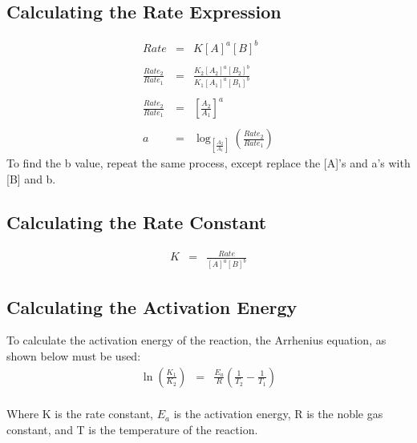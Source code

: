 \documentclass{article}
\begin{document}
\subsection*{Calculating the Rate Expression} %
\begin{eqnarray*}
Rate &=& K[A]^{a}[B]^{b} \\\\
\frac{Rate_{2}}{Rate_{1}} &=& \frac{K_{2}[A_{2}]^{a}[B_{2}]^{b}}{K_{1}[A_{1}]^{a}[B_{1}]^{b}} \\\\
\frac{Rate_{2}}{Rate_{1}} &=& \left[\frac{A_{2}}{A_{1}}\right]^a \\\\
a &=& \log_{\left[\frac{A_{2}}{A_{1}}\right]} \left(\frac{Rate_{2}}{Rate_{1}}\right) 
\end{eqnarray*}
To find the b value, repeat the same process, except replace the [A]'s and a's with [B] and b. 

\subsection*{Calculating the Rate Constant} %
\begin{eqnarray*}
K &=& \frac{Rate}{[A]^{a}[B]^{b}}
\end{eqnarray*}

\subsection*{Calculating the Activation Energy} %
To calculate the activation energy of the reaction, the Arrhenius equation, as shown below must be used:
\begin{eqnarray*}
\ln \left(\frac{K_1}{K_2}\right) &=& \frac{E_a}{R} \left(\frac{1}{T_2} - \frac{1}{T_1}\right)
\end{eqnarray*} \\
Where K is the rate constant, $E_a$ is the activation energy, R is the noble gas constant, and T is the temperature of the reaction. 
\end{document}
